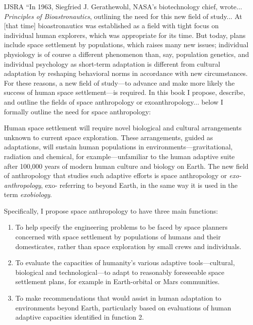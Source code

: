 \begin{labeling}{IJSRA}
	“In 1963, Siegfried J. Gerathewohl, NASA’s biotechnology chief, wrote... \emph{Principles of Bioastronautics}, outlining the need for this new field of study... At [that time] bioastronautics was established as a field with tight focus on individual human explorers, which was appropriate for its time. But today, plans include space settlement by populations, which raises many new issues; individual physiology is of course a different phenomenon than, say, population genetics, and individual psychology as short-term adaptation is different from cultural adaptation by reshaping behavioral norms in accordance with new circumstances. For these reasons, a new field of study—to advance and make more likely the success of human space settlement—is required. In this book I propose, describe, and outline the fields of space anthropology or exoanthropology... below I formally outline the need for space anthropology:

	Human space settlement will require novel biological and cultural arrangements unknown to current space exploration. These arrangements, guided as adaptations, will sustain human populations in environments—gravitational, radiation and chemical, for example—unfamiliar to the human adaptive suite after 100,000 years of modern human culture and biology on Earth. The new field of anthropology that studies such adaptive efforts is space anthropology or \emph{exo-anthropology}, exo- referring to beyond Earth, in the same way it is used in the term \emph{exobiology}.

	Specifically, I propose space anthropology to have three main functions:

	\begin{enumerate}

		\item To help specify the engineering problems to be faced by space planners concerned with space settlement by populations of humans and their domesticates, rather than space exploration by small crews and individuals.

		\item To evaluate the capacities of humanity’s various adaptive tools—cultural, biological and technological—to adapt to reasonably foreseeable space settlement plans, for example in Earth-orbital or Mars communities.

		\item To make recommendations that would assist in human adaptation to environments beyond Earth, particularly based on evaluations of human adaptive capacities identified in function 2.


\end{enumerate}
\end{labeling}
